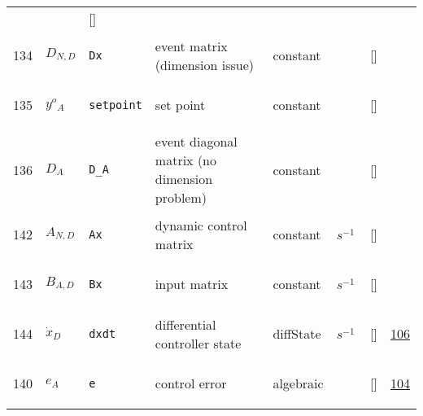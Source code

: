 \begin{longtable}{|p{1cm}|p{3cm}|p{3cm}|p{7cm}|p{3.0cm}|p{3cm}|p{2cm}|p{1cm}|}
             & $  $
             & []
             & \\
    134
             & \hypertarget{"v:134"}{ $ {D}{_{N, D}} $}
             & \verb|Dx|
             & event matrix (dimension issue)
             & \begin{lay}constant \end{lay}
             & $  $
             & []
             & \\
    135
             & \hypertarget{"v:135"}{ $ {y^o}{_{A}} $}
             & \verb|setpoint|
             & set point
             & \begin{lay}constant \end{lay}
             & $  $
             & []
             & \\
    136
             & \hypertarget{"v:136"}{ $ {D}{_{A}} $}
             & \verb|D_A|
             & event diagonal matrix (no dimension problem)
             & \begin{lay}constant \end{lay}
             & $  $
             & []
             & \\
    142
             & \hypertarget{"v:142"}{ $ {A}{_{N, D}} $}
             & \verb|Ax|
             & dynamic control matrix
             & \begin{lay}constant \end{lay}
             & $ s^{-1} \, $
             & []
             & \\
    143
             & \hypertarget{"v:143"}{ $ {B}{_{A, D}} $}
             & \verb|Bx|
             & input matrix
             & \begin{lay}constant \end{lay}
             & $ s^{-1} \, $
             & []
             & \\
    144
             & \hypertarget{"v:144"}{ $ {\dot{x}}{_{D}} $}
             & \verb|dxdt|
             & differential controller state
             & \begin{lay}diffState \end{lay}
             & $ s^{-1} \, $
             & []
             & \hyperlink{"e:106"}{ 106 }
                 \\
    140
             & \hypertarget{"v:140"}{ $ {e}{_{A}} $}
             & \verb|e|
             & control error
             & \begin{lay}algebraic \end{lay}
             & $  $
             & []
             & \hyperlink{"e:104"}{ 104 }
                 \\
    \end{longtable}